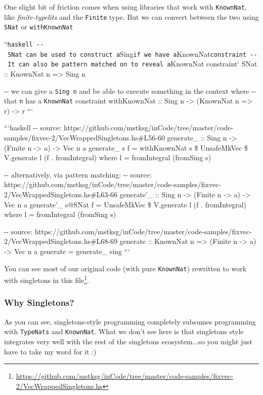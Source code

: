 \documentclass[]{article}
\renewcommand{\href}[2]{#2\footnote{\url{#1}}}
\begin{document}
One slight bit of friction comes when using libraries that work with
\texttt{KnownNat}, like \emph{finite-typelits} and the \texttt{Finite} type. But
we can convert between the two using \texttt{SNat} or \texttt{withKnownNat}

``\texttt{haskell\ -\/-\ SNat\ can\ be\ used\ to\ construct\ a}Sing\texttt{if\ we\ have\ a}KnownNat\texttt{constraint\ -\/-\ It\ can\ also\ be\ pattern\ matched\ on\ to\ reveal\ a}KnownNat
constraint` SNat :: KnownNat n =\textgreater{} Sing n

-\/- we can give a \texttt{Sing\ n} and be able to execute something in the
context where -\/- that \texttt{n} has a \texttt{KnownNat} constraint
withKnownNat :: Sing n -\textgreater{} (KnownNat n =\textgreater{} r)
-\textgreater{} r ```

```haskell -\/- source:
https://github.com/mstksg/inCode/tree/master/code-samples/fixvec-2/VecWrappedSingletons.hs\#L56-60
generate\_ :: Sing n -\textgreater{} (Finite n -\textgreater{} a)
-\textgreater{} Vec n a generate\_ s f = withKnownNat s \$ UnsafeMkVec \$
V.generate l (f . fromIntegral) where l = fromIntegral (fromSing s)

-\/- alternatively, via pattern matching: -\/- source:
https://github.com/mstksg/inCode/tree/master/code-samples/fixvec-2/VecWrappedSingletons.hs\#L63-66
generate'\_ :: Sing n -\textgreater{} (Finite n -\textgreater{} a)
-\textgreater{} Vec n a generate'\_ s@SNat f = UnsafeMkVec \$ V.generate l (f .
fromIntegral) where l = fromIntegral (fromSing s)

-\/- source:
https://github.com/mstksg/inCode/tree/master/code-samples/fixvec-2/VecWrappedSingletons.hs\#L68-69
generate :: KnownNat n =\textgreater{} (Finite n -\textgreater{} a)
-\textgreater{} Vec n a generate = generate\_ sing ```

You can see most of our original code (with pure \texttt{KnownNat}) rewritten to
work with singletons in
\href{https://github.com/mstksg/inCode/tree/master/code-samples/fixvec-2/VecWrappedSingletons.hs}{this
file}.

\subsubsection{Why Singletons?}

As you can see, singletons-style programming completely subsumes programming
with \texttt{TypeNats} and \texttt{KnownNat}. What we don't see here is that
singletons style integrates very well with the rest of the singletons
ecosystem...so you might just have to take my word for it :)
\end{document}
